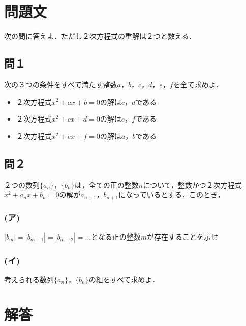 \documentclass[../main]{subfiles}
\begin{document}
\section{問題文}
次の問に答えよ．ただし２次方程式の重解は２つと数える．
\subsection*{問１}
次の３つの条件をすべて満たす整数$a$，$b$，$c$，$d$，$e$，$f$を全て求めよ．
\begin{itemize}
\item ２次方程式$x^{2}+ax+b=0$の解は$c$，$d$である
\item ２次方程式$x^{2}+cx+d=0$の解は$e$，$f$である
\item ２次方程式$x^{2}+ex+f=0$の解は$a$，$b$である
\end{itemize}
\subsection*{問２}
２つの数列$\{a_n\}$，$\{b_n\}$は，全ての正の整数$n$について，整数かつ２次方程式$x^{2}+a_{n}x+b_{n}=0$の解が$a_{n+1}$，$b_{n+1}$になっているとする．このとき，
\subsubsection*{(ア)}$|b_m|=|b_{m+1}|=|b_{m+2}|=\dots$となる正の整数$m$が存在することを示せ
\subsubsection*{(イ)}考えられる数列$\{a_n\}$，$\{b_n\}$の組をすべて求めよ．
\section{解答}
\end{document}
